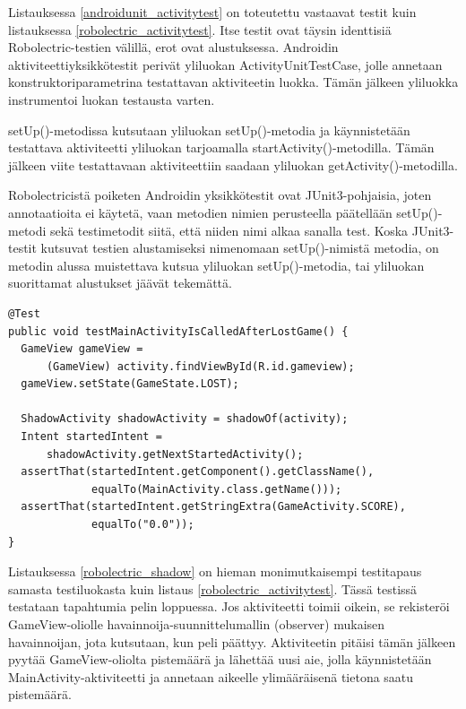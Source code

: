Listauksessa \ref{androidunit_activitytest} on toteutettu vastaavat testit kuin listauksessa \ref{robolectric_activitytest}. Itse testit ovat täysin identtisiä Robolectric-testien välillä, erot ovat alustuksessa. Androidin aktiviteettiyksikkötestit perivät yliluokan ActivityUnitTestCase, jolle annetaan konstruktoriparametrina testattavan aktiviteetin luokka. Tämän jälkeen yliluokka instrumentoi luokan testausta varten.

setUp()-metodissa kutsutaan yliluokan setUp()-metodia ja käynnistetään testattava aktiviteetti yliluokan tarjoamalla startActivity()-metodilla. Tämän jälkeen viite testattavaan aktiviteettiin saadaan yliluokan getActivity()-metodilla.

Robolectricistä poiketen Androidin yksikkötestit ovat JUnit3-pohjaisia, joten annotaatioita ei käytetä, vaan metodien nimien perusteella päätellään setUp()-metodi sekä testimetodit siitä, että niiden nimi alkaa sanalla test. Koska JUnit3-testit kutsuvat testien alustamiseksi nimenomaan setUp()-nimistä metodia, on metodin alussa muistettava kutsua yliluokan setUp()-metodia, tai yliluokan suorittamat alustukset jäävät tekemättä.

\begin{lstlisting}[float,label=robolectric_shadow,caption=Aikeen tilatietojen tarkastelu Robolectricin varjo-olioilla]
@Test
public void testMainActivityIsCalledAfterLostGame() {
  GameView gameView = 
      (GameView) activity.findViewById(R.id.gameview);
  gameView.setState(GameState.LOST);
  	
  ShadowActivity shadowActivity = shadowOf(activity);
  Intent startedIntent = 
      shadowActivity.getNextStartedActivity();
  assertThat(startedIntent.getComponent().getClassName(), 
             equalTo(MainActivity.class.getName()));
  assertThat(startedIntent.getStringExtra(GameActivity.SCORE), 
             equalTo("0.0"));
}
\end{lstlisting}

Listauksessa \ref{robolectric_shadow} on hieman monimutkaisempi testitapaus samasta testiluokasta kuin listaus \ref{robolectric_activitytest}. Tässä testissä testataan tapahtumia pelin loppuessa. Jos aktiviteetti toimii oikein, se rekisteröi GameView-oliolle havainnoija-suunnittelumallin (observer) mukaisen havainnoijan, jota kutsutaan, kun peli päättyy. Aktiviteetin pitäisi tämän jälkeen pyytää GameView-oliolta pistemäärä ja lähettää uusi aie, jolla käynnistetään MainActivity-aktiviteetti ja annetaan aikeelle ylimääräisenä tietona saatu pistemäärä.

